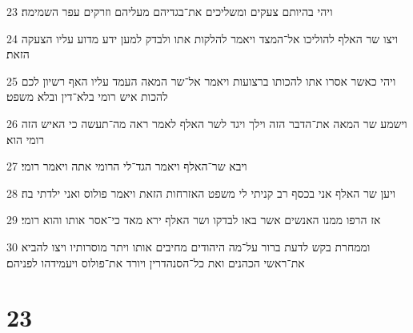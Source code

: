 \par 23 ויהי בהיותם צעקים ומשליכים את־בגדיהם מעליהם וזרקים עפר השמימה׃
\par 24 ויצו שר האלף להוליכו אל־המצד ויאמר להלקות אתו ולבדק למען ידע מדוע עליו הצעקה הזאת׃
\par 25 ויהי כאשר אסרו אתו להכותו ברצועות ויאמר אל־שר המאה העמד עליו האף רשיון לכם להכות איש רומי בלא־דין ובלא משפט׃
\par 26 וישמע שר המאה את־הדבר הזה וילך ויגד לשר האלף לאמר ראה מה־תעשה כי האיש הזה רומי הוא׃
\par 27 ויבא שר־האלף ויאמר הגד־לי הרומי אתה ויאמר רומי׃
\par 28 ויען שר האלף אני בכסף רב קניתי לי משפט האזרחות הזאת ויאמר פולוס ואני ילדתי בה׃
\par 29 אז הרפו ממנו האנשים אשר באו לבדקו ושר האלף ירא מאד כי־אסר אותו והוא רומי׃
\par 30 וממחרת בקש לדעת ברור על־מה היהודים מחיבים אותו ויתר מוסרותיו ויצו להביא את־ראשי הכהנים ואת כל־הסנהדרין ויורד את־פולוס ויעמידהו לפניהם׃

\chapter{23}

